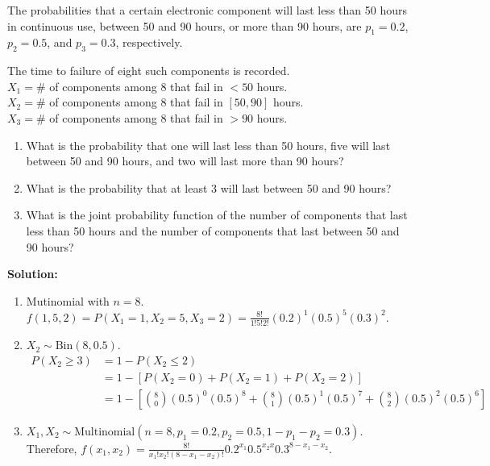 \pagebreak

\begin{example}
    The probabilities that a certain electronic component will last less than 50 hours in continuous use, between 50 and 90 hours, or more than 90 hours, are $p_1 = 0.2$, $p_2 = 0.5$, and $p_3 = 0.3$, respectively.

    The time to failure of eight such components is recorded. \\
    $X_1 = \#$ of components among 8 that fail in $< 50$ hours. \\
    $X_2 = \#$ of components among 8 that fail in $[50,90]$ hours. \\
    $X_3 = \#$ of components among 8 that fail in $> 90$ hours.
    \begin{enumerate}[label=(\alph*)]
        \item What is the probability that one will last less than 50 hours, five will last between 50 and 90 hours, and two will last more than 90 hours?
        \item What is the probability that at least 3 will last between 50 and 90 hours?
        \item What is the joint probability function of the number of components that last less than 50 hours and the number of components that last between 50 and 90 hours?
    \end{enumerate}

    \textbf{Solution:}
    \begin{enumerate}[label=(\alph*)]
        \item Mutinomial with $n=8$. $f(1,5,2) = P(X_1 = 1, X_2 = 5, X_3 = 2) = \frac{8!}{1!5!2!}(0.2)^1 (0.5)^5 (0.3)^2$.
        \item $X_2 \sim \text{Bin}(8,0.5)$. \vspace{-3mm}
        \begin{align*}
            P(X_2 \geq 3) &= 1 - P(X_2 \leq 2) \\
            &= 1 - \left[ P(X_2 = 0) + P(X_2 = 1) + P(X_2 = 2) \right] \\
            &= 1 - \left[ \binom{8}{0} (0.5)^0 (0.5)^8 + \binom{8}{1} (0.5)^1 (0.5)^7 + \binom{8}{2} (0.5)^2 (0.5)^6 \right]
        \end{align*}
        \item $X_1,X_2 \sim \text{Multinomial}(n=8,p_1=0.2,p_2=0.5,1-p_1 -p_2 = 0.3)$. \\
        Therefore, $f(x_1,x_2) = \frac{8!}{x_1! x_2! (8-x_1 - x_2)!}0.2^{x_1}0.5^{x_2x} 0.3^{8-x_1-x_2}$.
    \end{enumerate}
\end{example}




